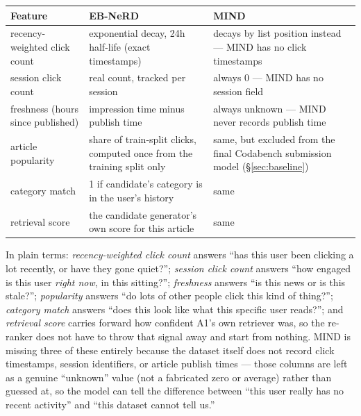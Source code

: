 \documentclass[11pt,a4paper]{article}
\begin{document}
\begin{center}
\begin{tabular}{@{}p{4.4cm}p{5.2cm}p{4.9cm}@{}}
\toprule
\textbf{Feature} & \textbf{EB-NeRD} & \textbf{MIND} \\
\midrule
recency-weighted click count & exponential decay, 24h half-life (exact timestamps) & decays by
list position instead --- MIND has no click timestamps \\
session click count & real count, tracked per session & always 0 --- MIND has no session field \\
freshness (hours since published) & impression time minus publish time & always unknown --- MIND
never records publish time \\
article popularity & share of train-split clicks, computed once from the training split only &
same, but excluded from the final Codabench submission model (\S\ref{sec:baseline}) \\
category match & 1 if candidate's category is in the user's history & same \\
retrieval score & the candidate generator's own score for this article & same \\
\bottomrule
\end{tabular}
\end{center}

In plain terms: \emph{recency-weighted click count} answers ``has this user been clicking a lot
recently, or have they gone quiet?''; \emph{session click count} answers ``how engaged is this
user \emph{right now}, in this sitting?''; \emph{freshness} answers ``is this news or is this
stale?''; \emph{popularity} answers ``do lots of other people click this kind of thing?'';
\emph{category match} answers ``does this look like what this specific user reads?''; and
\emph{retrieval score} carries forward how confident A1's own retriever was, so the re-ranker does
not have to throw that signal away and start from nothing. MIND is missing three of these entirely
because the dataset itself does not record click timestamps, session identifiers, or article
publish times --- those columns are left as a genuine ``unknown'' value (not a fabricated zero or
average) rather than guessed at, so the model can tell the difference between ``this user really
has no recent activity'' and ``this dataset cannot tell us.''
\end{document}
